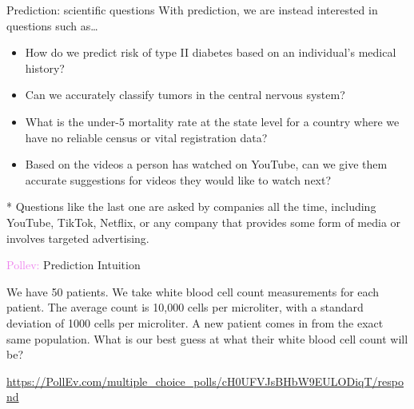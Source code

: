 \documentclass[10pt,t]{beamer}
\begin{document}
\begin{frame}{Prediction: scientific questions}
With prediction, we are instead interested in questions such as\dots

\vspace{0.3cm}

\begin{itemize}
	\item How do we predict risk of type II diabetes based on an individual's medical history?
	\medskip
	
	\item Can we accurately classify tumors in the central nervous system?
	
	\medskip
	
	\item What is the under-5 mortality rate at the state level for a country where we have no reliable census or vital registration data?
	\medskip
	
	\item Based on the videos a person has watched on YouTube, can we give them accurate suggestions for videos they would like to watch next?
\end{itemize}

\vspace{0.3cm}

* Questions like the last one are asked by companies all the time, including YouTube, TikTok, Netflix, or any company that provides some form of media or involves targeted advertising. 
\end{frame}




\begin{frame}{\textcolor{violet}{Pollev:} Prediction Intuition}
	
	We have 50 patients. We take white blood cell count measurements for each patient. The average count is 10,000 cells per microliter, with a standard deviation of 1000 cells per microliter. A new patient comes in from the exact same population. What is our best guess at what their white blood cell count will be?
	\smallskip
	
	\url{https://PollEv.com/multiple_choice_polls/cH0UFVJsBHbW9EULODiqT/respond}

	
	
\end{frame}
\end{document}
